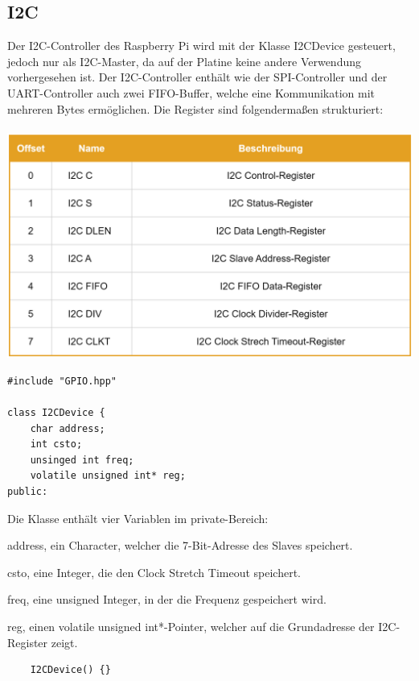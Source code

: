 \documentclass[12pt]{article}
\begin{document}
\subsection{I2C}
Der I2C-Controller des Raspberry Pi wird mit der Klasse I2CDevice gesteuert, jedoch nur als I2C-Master, da auf der Platine keine andere Verwendung vorhergesehen ist. Der I2C-Controller enthält wie der SPI-Controller und der UART-Controller auch zwei FIFO-Buffer, welche eine Kommunikation mit mehreren Bytes ermöglichen. Die Register sind folgendermaßen strukturiert:\\\\
\includegraphics[width=\textwidth]{img/i2c_table.png}
\begin{center}\end{center}
\begin{verbatim}
#include "GPIO.hpp"

class I2CDevice {
    char address;
    int csto;
    unsinged int freq;
    volatile unsigned int* reg;
public:
\end{verbatim}
Die Klasse enthält vier Variablen im private-Bereich:
\begin{compactitem}
\item address, ein Character, welcher die 7-Bit-Adresse des Slaves speichert.
\item csto, eine Integer, die den Clock Stretch Timeout speichert.
\item freq, eine unsigned Integer, in der die Frequenz gespeichert wird.
\item reg, einen volatile unsigned int*-Pointer, welcher auf die Grundadresse der I2C-Register zeigt.
\end{compactitem}
\newpage
\begin{verbatim}
    I2CDevice() {}
\end{verbatim}
\end{document}
